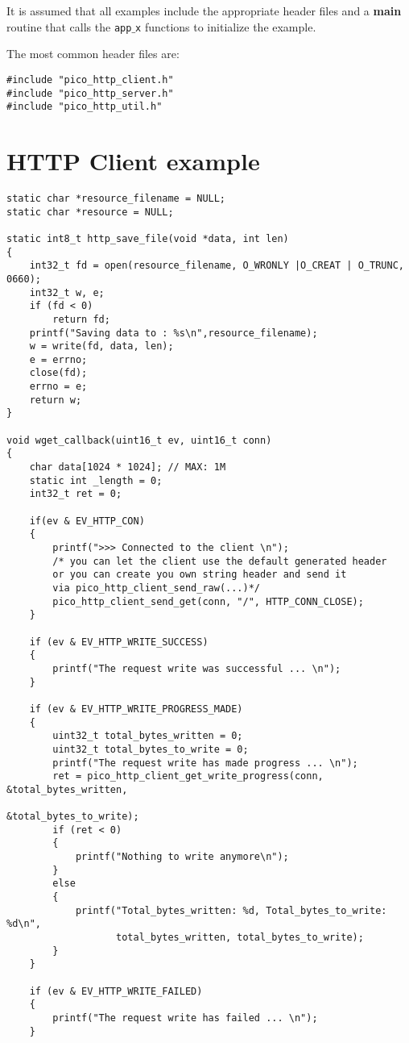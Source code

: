 It is assumed that all examples include the appropriate header files
and a \textbf{main} routine that calls the \texttt{app$\_$x} functions to initialize
the example.

The most common header files are:
\begin{verbatim}
#include "pico_http_client.h"
#include "pico_http_server.h"
#include "pico_http_util.h"
\end{verbatim}

\section{HTTP Client example}
\begin{verbatim}
static char *resource_filename = NULL;
static char *resource = NULL;

static int8_t http_save_file(void *data, int len)
{
    int32_t fd = open(resource_filename, O_WRONLY |O_CREAT | O_TRUNC, 0660);
    int32_t w, e;
    if (fd < 0)
        return fd;
    printf("Saving data to : %s\n",resource_filename);
    w = write(fd, data, len);
    e = errno;
    close(fd);
    errno = e;
    return w;
}

void wget_callback(uint16_t ev, uint16_t conn)
{
    char data[1024 * 1024]; // MAX: 1M
    static int _length = 0;
    int32_t ret = 0;

    if(ev & EV_HTTP_CON)
    {
        printf(">>> Connected to the client \n");
        /* you can let the client use the default generated header
        or you can create you own string header and send it
        via pico_http_client_send_raw(...)*/
        pico_http_client_send_get(conn, "/", HTTP_CONN_CLOSE);
    }

    if (ev & EV_HTTP_WRITE_SUCCESS)
    {
        printf("The request write was successful ... \n");
    }

    if (ev & EV_HTTP_WRITE_PROGRESS_MADE)
    {
        uint32_t total_bytes_written = 0;
        uint32_t total_bytes_to_write = 0;
        printf("The request write has made progress ... \n");
        ret = pico_http_client_get_write_progress(conn, &total_bytes_written,
                                                  &total_bytes_to_write);
        if (ret < 0)
        {
            printf("Nothing to write anymore\n");
        }
        else
        {
            printf("Total_bytes_written: %d, Total_bytes_to_write: %d\n",
                   total_bytes_written, total_bytes_to_write);
        }
    }

    if (ev & EV_HTTP_WRITE_FAILED)
    {
        printf("The request write has failed ... \n");
    }


\end{verbatim}
